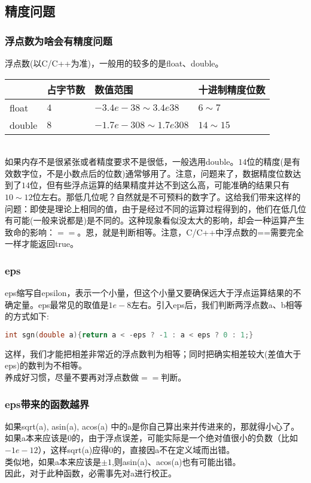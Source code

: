 \subsection{精度问题}
    \subsubsection{浮点数为啥会有精度问题}
	浮点数(以C/C++为准)，一般用的较多的是float、double。\\
	\begin{table}[htbp]
	    \centering
	    \begin{tabular}{l|l|l|l}
		\toprule
		&占字节数&数值范围&十进制精度位数\\
		\midrule
		float&$4$&$-3.4e-38\sim 3.4e38$&$6\sim 7$\\
		double&$8$&$-1.7e-308\sim 1.7e308$&$14\sim 15$\\
		\bottomrule
	    \end{tabular}
	\end{table}
	~\\
	如果内存不是很紧张或者精度要求不是很低，一般选用double。$14$位的精度(是有效数字位，不是小数点后的位数)通常够用了。注意，问题来了，数据精度位数达到了$14$位，但有些浮点运算的结果精度并达不到这么高，可能准确的结果只有$10\sim 12$位左右。那低几位呢？自然就是不可预料的数字了。这给我们带来这样的问题：即使是理论上相同的值，由于是经过不同的运算过程得到的，他们在低几位有可能(一般来说都是)是不同的。这种现象看似没太大的影响，却会一种运算产生致命的影响：$==$。恩，就是判断相等。注意，C/C++中浮点数的==需要完全一样才能返回true。\\
	
    \subsubsection{eps}
	eps缩写自epsilon，表示一个小量，但这个小量又要确保远大于浮点运算结果的不确定量。eps最常见的取值是$1e-8$左右。引入eps后，我们判断两浮点数a、b相等的方式如下:
	\begin{lstlisting}[language=c++]
int sgn(double a){return a < -eps ? -1 : a < eps ? 0 : 1;}
	\end{lstlisting}
	这样，我们才能把相差非常近的浮点数判为相等；同时把确实相差较大(差值大于eps)的数判为不相等。\\
	养成好习惯，尽量不要再对浮点数做$==$判断。\\

    \subsubsection{eps带来的函数越界}
	如果sqrt(a), asin(a), acos(a) 中的a是你自己算出来并传进来的，那就得小心了。\\
	如果a本来应该是$0$的，由于浮点误差，可能实际是一个绝对值很小的负数（比如$-1e-12$），这样sqrt(a)应得$0$的，直接因a不在定义域而出错。\\
	类似地，如果a本来应该是$\pm 1$,则asin(a)、acos(a)也有可能出错。\\
	因此，对于此种函数，必需事先对a进行校正。\\
	
